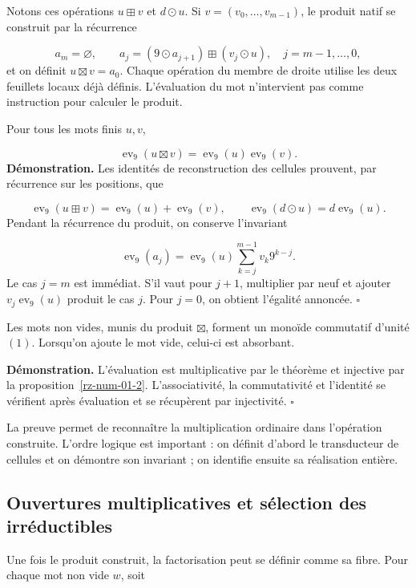 Notons ces opérations $u\boxplus v$ et $d\odot u$. Si $v=(v_0,\ldots,v_{m-1})$, le produit natif se construit par la récurrence

\[
a_m=\varnothing,\qquad
a_j=(9\odot a_{j+1})\boxplus(v_j\odot u),
\quad j=m-1,\ldots,0,
\]
et on définit $u\boxtimes v=a_0$. Chaque opération du membre de droite utilise les deux feuillets locaux déjà définis. L'évaluation du mot n'intervient pas comme instruction pour calculer le produit.

Pour tous les mots finis $u,v$,

\[
\operatorname{ev}_9(u\boxtimes v)
=\operatorname{ev}_9(u)\operatorname{ev}_9(v).
\]
\textbf{Démonstration.} Les identités de reconstruction des cellules prouvent, par récurrence sur les positions, que

\[
\operatorname{ev}_9(u\boxplus v)
=\operatorname{ev}_9(u)+\operatorname{ev}_9(v),\qquad
\operatorname{ev}_9(d\odot u)=d\operatorname{ev}_9(u).
\]
Pendant la récurrence du produit, on conserve l'invariant

\[
\operatorname{ev}_9(a_j)
=\operatorname{ev}_9(u)\sum_{k=j}^{m-1}v_k9^{k-j}.
\]
Le cas $j=m$ est immédiat. S'il vaut pour $j+1$, multiplier par neuf et ajouter $v_j\operatorname{ev}_9(u)$ produit le cas $j$. Pour $j=0$, on obtient l'égalité annoncée. \hfill\(\square\)

Les mots non vides, munis du produit $\boxtimes$, forment un monoïde commutatif d'unité $(1)$. Lorsqu'on ajoute le mot vide, celui-ci est absorbant.

\textbf{Démonstration.} L’évaluation est multiplicative par le théorème et injective par la proposition~\ref{rz-num-01-2}. L’associativité, la commutativité et l’identité se vérifient après évaluation et se récupèrent par injectivité. \hfill\(\square\)

La preuve permet de reconnaître la multiplication ordinaire dans l'opération construite. L'ordre logique est important : on définit d'abord le transducteur de cellules et on démontre son invariant ; on identifie ensuite sa réalisation entière.

\subsection{Ouvertures multiplicatives et sélection des irréductibles}
Une fois le produit construit, la factorisation peut se définir comme sa fibre. Pour chaque mot non vide $w$, soit

